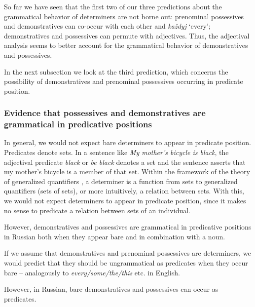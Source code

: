 \documentclass[output=paper]{langscibook}
\begin{document}

\noindent So far we have seen that the first two of our three predictions about the grammatical behavior of determiners are not borne out: prenominal possessives and demonstratives can co-occur with each other and \textit{každyj} `every'; demonstratives and possessives can permute with adjectives. Thus, the adjectival analysis seems to better account for the grammatical behavior of demonstratives and possessives.

In the next subsection we look at the third prediction, which concerns the possibility of demonstratives and prenominal possessives occurring in predicate position.


\subsubsection{Evidence that possessives and demonstratives are grammatical in predicative positions}\label{subsubsec:evidence}

In general, we would not expect bare determiners to appear in predicate position. Predicates denote sets. In a sentence like \textit{My mother’s bicycle is black}, the adjectival predicate \textit{black} or \textit{be black} denotes a set and the sentence asserts that my mother’s bicycle is a member of that set. Within the framework of the theory of generalized quantifiers \citep{BarwiseCooper1981}, a determiner is a function from sets to generalized quantifiers (sets of sets), or more intuitively, a relation between sets. With this, we would not expect determiners to appear in predicate position, since it makes no sense to predicate a relation between sets of an individual. 

However, demonstratives and possessives are grammatical in predicative positions in Russian both when they appear bare and in combination with a noun.



If we assume that demonstratives and prenominal possessives are determiners, we would predict that they should be ungrammatical as predicates when they occur bare -- analogously to \textit{every\slash some\slash the\slash this} etc. in English. 

However, in Russian, bare demonstratives and possessives can occur as predicates.
\end{document}
